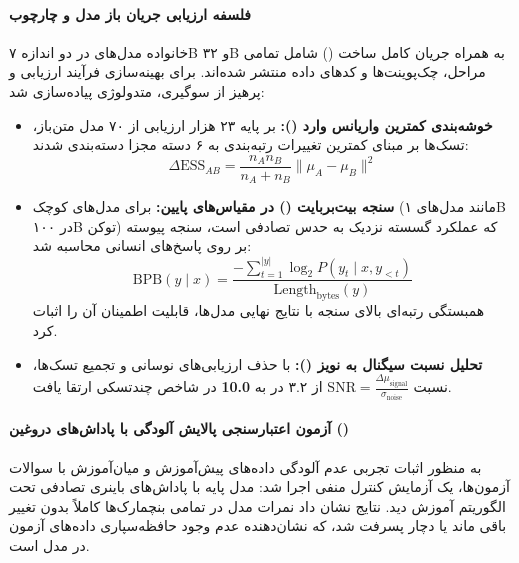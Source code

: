 \item {}

\paragraph*{فلسفه ارزیابی جریان باز مدل و چارچوب }
خانواده مدل‌های  \cite{olmo3team2025} در دو اندازه ۷B و ۳۲B به همراه جریان کامل ساخت () شامل تمامی مراحل، چک‌پوینت‌ها و کدهای داده منتشر شده‌اند.
برای بهینه‌سازی فرآیند ارزیابی و پرهیز از سوگیری، متدولوژی  پیاده‌سازی شد:
\begin{itemize}
    \item \textbf{خوشه‌بندی کمترین واریانس وارد ():} بر پایه ۲۳ هزار ارزیابی از ۷۰ مدل متن‌باز، تسک‌ها بر مبنای کمترین تغییرات رتبه‌بندی به ۶ دسته مجزا دسته‌بندی شدند:
    \begin{equation}
        \Delta \text{ESS}_{AB} = \frac{n_A n_B}{n_A + n_B} \|\mu_A - \mu_B\|^2
    \end{equation}
    \item \textbf{سنجه بیت‌بربایت () در مقیاس‌های پایین:} برای مدل‌های کوچک (مانند مدل‌های ۱B در ۱۰۰B توکن) که عملکرد گسسته  نزدیک به حدس تصادفی است، سنجه پیوسته  بر روی پاسخ‌های انسانی محاسبه شد:
    \begin{equation}
        \text{BPB}(y \mid x) = \frac{-\sum_{t=1}^{|y|} \log_2 P(y_t \mid x, y_{<t})}{\text{Length}_{\text{bytes}}(y)}
    \end{equation}
    همبستگی رتبه‌ای بالای سنجه  با نتایج نهایی مدل‌ها، قابلیت اطمینان آن را اثبات کرد.
    \item \textbf{تحلیل نسبت سیگنال به نویز ():} با حذف ارزیابی‌های نوسانی و تجمیع تسک‌ها، نسبت $\text{SNR} = \frac{\Delta \mu_{\text{signal}}}{\sigma_{\text{noise}}}$ از ۳.۲ در  به \textbf{10.0} در شاخص چندتسکی ارتقا یافت.
\end{itemize}

\paragraph*{آزمون اعتبارسنجی پالایش آلودگی با پاداش‌های دروغین ()}
به منظور اثبات تجربی عدم آلودگی داده‌های پیش‌آموزش و میان‌آموزش با سوالات آزمون‌ها، یک آزمایش کنترل منفی اجرا شد: مدل پایه  با پاداش‌های باینری تصادفی تحت الگوریتم  آموزش دید. نتایج نشان داد نمرات مدل در تمامی بنچمارک‌ها کاملاً بدون تغییر باقی ماند یا دچار پسرفت شد، که نشان‌دهنده عدم وجود حافظه‌سپاری داده‌های آزمون در مدل است.

